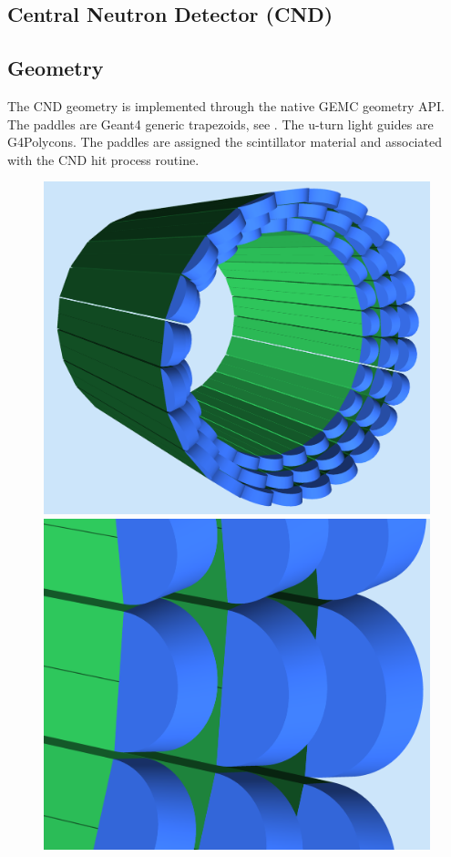 \subsection{Central Neutron Detector (CND)}

\subsection{Geometry}

The CND geometry is implemented through the native GEMC geometry API.
The paddles are Geant4 generic trapezoids, see . The u-turn light guides are G4Polycons.
The paddles are assigned the scintillator material and associated with the CND hit process routine.

\begin{figure}
	\centering
	\includegraphics[width=0.99\columnwidth,keepaspectratio]{img/cndGeometry.png}
	\includegraphics[width=0.99\columnwidth,keepaspectratio]{img/cndDetail.png}

\end{figure}
